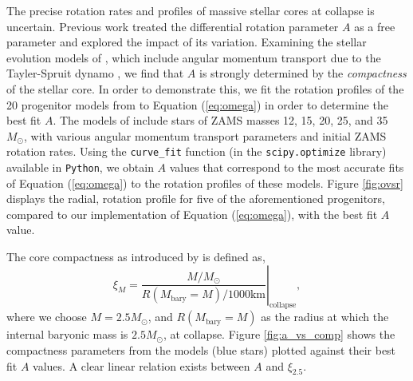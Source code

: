 \documentclass[twocolumn,times]{aastex62}  %
\begin{document}
The precise rotation rates and profiles of massive stellar cores at collapse is uncertain.
Previous work \citep[e.g.,][]{abdik:2014} treated the differential rotation parameter $A$ as a free parameter and explored the impact of its variation.
Examining the stellar evolution models of \citet{heger:2005}, which include angular momentum transport due to the Tayler-Spruit dynamo \citep{spruit:2002}, we find that $A$ is strongly determined by the {\it compactness} \citep{oconnor:2011} of the stellar core.
In order to demonstrate this, we fit the rotation profiles of the 20 progenitor models from \citet{heger:2005} to Equation (\ref{eq:omega}) in order to determine the best fit $A$.
The models of \citet{heger:2005} include stars of ZAMS masses 12, 15, 20, 25, and 35 $M_{\odot}$, with various angular momentum transport parameters and initial ZAMS rotation rates.  
Using the \texttt{curve\_fit} function (in the \texttt{scipy.optimize} library) available in \texttt{Python}, we obtain $A$ values that correspond to the most accurate fits of Equation (\ref{eq:omega}) to the rotation profiles of these models.  Figure \ref{fig:ovsr} displays the radial, rotation profile for five of the aforementioned progenitors, compared to our implementation of Equation (\ref{eq:omega}), with the best fit $A$ value.

The core compactness as introduced by \citet{oconnor:2011} is defined as,
\begin{equation}
    \xi_M = \left.\frac{M/M_{\odot}}{R(M_\mathrm{bary}=M)/1000 \text{km}}\right\vert_\mathrm{collapse} ,
\end{equation} 
where we choose $M = 2.5 M_\odot$, and $R(M_{\mathrm{bary}}=M) $ as the radius at which the internal baryonic mass is $2.5M_\odot$, at collapse.  
Figure \ref{fig:a_vs_comp} shows the compactness parameters from the \citet{heger:2005} models (blue stars) plotted against their best fit $A$ values.
A clear linear relation exists between $A$ and $\xi_{2.5}$.  
\end{document}
